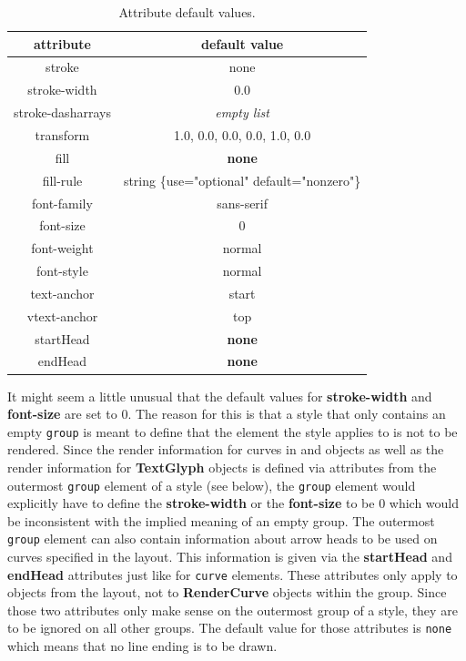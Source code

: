 \vspace{0.5cm}
\begin{table}[h]
\begin{center}
\begin{tabular}{|c|c|}\hline
\textbf{attribute} & \textbf{default value} \\ \hline\hline
stroke & none \\ \hline
stroke-width & 0.0 \\ \hline
stroke-dasharrays & \textit{empty list} \\ \hline
transform &  1.0, 0.0, 0.0, 0.0, 1.0, 0.0 \\ \hline
fill & \textbf{none}\\ \hline
fill-rule & string \{use="optional" default="nonzero"\}\\ \hline
font-family & sans-serif \\ \hline
font-size & 0 \\ \hline
font-weight & normal \\ \hline
font-style & normal \\ \hline
text-anchor & start\\ \hline
vtext-anchor & top\\ \hline
startHead & \textbf{none} \\ \hline
endHead & \textbf{none} \\ \hline
\end{tabular}
\end{center}
\caption{Attribute default values.}
\label{attribute_defaults}
\end{table}
\vspace{0.5cm}

It might seem a little unusual that the default values for \textbf{stroke-width} and
\textbf{font-size} are set to 0. The reason for this is that a style that only contains
an empty \texttt{group} is meant to define that the element the style applies to is not
to be rendered. Since the render information for curves in
\SpeciesReferenceGlyph and \ReactionGlyph objects as well as the render information for
\textbf{TextGlyph} objects is defined via attributes from the outermost \texttt{group} element of a
style (see below), the \texttt{group} element would explicitly have to define the \textbf{stroke-width} or the
\textbf{font-size} to be 0 which would be inconsistent with the implied meaning of an
empty group.
The outermost \texttt{group} element can also contain information about arrow heads to be used on curves 
specified in the layout. This information is given via the \textbf{startHead} and \textbf{endHead}
attributes just like for \texttt{curve} elements. These attributes only apply to \RenderCurve objects from the layout, not
to \textbf{RenderCurve} objects within the group. Since those two attributes only make sense on the outermost group of a style,
they are to be ignored on all other groups. The default value for those attributes is \texttt{none} which means that 
no line ending is to be drawn. 


